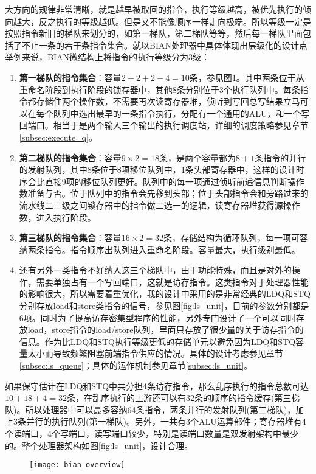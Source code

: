 大方向的规律非常清晰，就是越早被取回的指令，执行等级越高，被优先执行的倾向越大，反之执行的等级越低。但是又不能像顺序一样走向极端。所以等级一定是按照指令新旧的梯队来划分的，如第一梯队，第二梯队等等，然后每一梯队里面包括了不止一条的若干条指令集合。就以BIAN处理器中具体体现出层级化的设计点举例来说，BIAN微结构上将指令的执行等级分为3级：
\begin{enumerate}[label=(\alph*)]
	\item \textbf{第一梯队的指令集合}：容量$2 + 2 + 2 + 4 = 10$条，参见图\ref{fig:bian_over1}。其中两条位于从重命名阶段到执行阶段的锁存器中，其他8条分别位于3个执行队列中。每条指令都存储住两个操作数，不需要再次读寄存器堆，侦听到写回总写结果立马可以在每个队列中选出最早的一条指令执行，分配有一个通用的ALU，和一个写回端口。相当于是两个输入三个输出的执行调度站，详细的调度策略参见章节\ref{subsec:execute_q}。
	\item \textbf{第二梯队的指令集合}：容量$ 9\times 2 = 18$条，是两个容量都为$ 8 + 1 $条指令的并行的发射队列，其中8条位于8项移位队列中，1条头部寄存器中，这样的设计时序会比直接9项的移位队列更好。队列中的每一项通过侦听前递信息判断操作数准备与否。位于队列中的指令会先移到头部；位于头部指令会和旁路过来的流水线二三级之间锁存器中的指令做二选一的逻辑，读寄存器堆获得源操作数，进入执行阶段。
	\item \textbf{第三梯队的指令集合}：容量$ 16\times 2 = 32$条，存储结构为循环队列，每一项可容纳两条指令。指令顺序出队列进入重命名阶段。容量最大，执行级别最低。
	\item 还有另外一类指令不好纳入这三个梯队中，由于功能特殊，而且是对外的操作，需要单独占有一个写回端口，这就是访存指令。这类指令对于处理器性能的影响很大，所以需要着重优化，我的设计中采用的是非常经典的LDQ和STQ分别存放load和store类指令的信号，参见图\ref{fig:ls_unit}，目前的参数分别都是6项。同时为了提高访存密集型程序的性能，另外专门设计了一个可以同时存放load，store指令的load/store队列，里面只存放了很少量的关于访存指令的信息。作为比LDQ和STQ执行等级更低的存储单元以避免因为LDQ和STQ容量太小而导致频繁阻塞前端指令供应的情况。具体的设计考虑参见章节\ref{subsec:ls_queue}；具体的运作机制参见章节\ref{subsec:ls_unit}。
\end{enumerate}

如果保守估计在LDQ和STQ中共分担4条访存指令，那么乱序执行的指令总数可达$ 10+18+4 = 32 $条，在乱序执行的上游还可以有32条的顺序的指令缓存(第三梯队)。所以处理器中可以最多容纳64条指令，两条并行的发射队列(第二梯队)，加上3条并行的执行队列(第一梯队)。另外，一共有3个ALU运算部件；寄存器堆有4个读端口，4个写端口，读写端口较少，特别是读端口数量是双发射架构中最少的。整个处理器架构如图\ref{fig:ls_unit}，设计合理。
\begin{figure}[!htbp]
	\centering
	\texttt{[image: bian\_overview]}
	\label{fig:bian_over1}
\end{figure}

